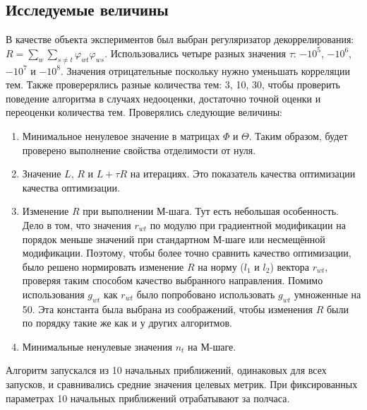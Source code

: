 \documentclass[12pt]{article}
\renewcommand{\phi}{\varphi}
\begin{document}
\subsection{Исследуемые величины}
В качестве объекта экспериментов был выбран регуляризатор декоррелирования: $R = \sum_w \sum_{s \neq t} \phi_{wt} \phi_{ws}$. Использовались четыре разных значения $\tau$: $-10^5$, $-10^6$, $-10^7$ и $-10^8$. Значения отрицательные поскольку нужно уменьшать корреляции тем. Также проверерялись разные количества тем: 3, 10, 30, чтобы проверить поведение алгоритма в случаях недооценки, достаточно точной оценки и переоценки  количества тем. Проверялись следующие величины:
\begin{enumerate}
\item Минимальное ненулевое значение в матрицах $\Phi$ и $\Theta$. Таким образом, будет проверено выполнение свойства отделимости от нуля.
\item Значение $L$, $R$ и $L + \tau R$ на итерациях. Это показатель качества оптимизации качества оптимизации.
\item Изменение $R$ при выполнении М-шага. Тут есть  небольшая особенность. Дело в том, что значения $r_{wt}$ по модулю  при градиентной модификации на порядок меньше значений при стандартном М-шаге или несмещённой модификации. Поэтому, чтобы более точно сравнить качество оптимизации,  было решено нормировать изменение $R$ на норму ($l_1$ и $l_2$) вектора $r_{wt}$, проверяя таким способом качество выбранного направления. Помимо использования $g_{wt}$ как $r_{wt}$ было попробовано использовать $g_{wt}$ умноженные на 50. Эта константа была выбрана из соображений, чтобы изменения $R$ были по порядку такие же как и у других алгоритмов.
\item Минимальные ненулевые значения $n_t$  на М-шаге.
\end{enumerate}
Алгоритм  запускался из 10 начальных приближений, одинаковых для всех запусков, и сравнивались средние значения целевых метрик. При фиксированных параметрах 10 начальных приближений отрабатывают за полчаса.
\end{document}
